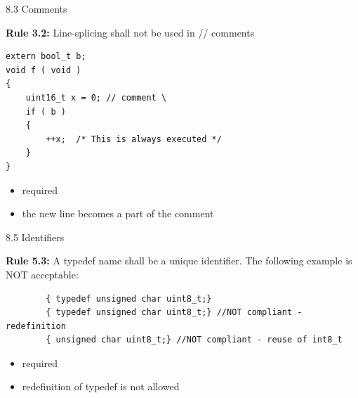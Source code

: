 \documentclass[t]{beamer} %
\begin{document}

\begin{frame}[fragile]{8.3 Comments}
\begin{block}{\textbf{Rule 3.2:} Line-splicing shall not be used in // comments}


\begin{lstlisting}
extern bool_t b;
void f ( void )
{
    uint16_t x = 0; // comment \
    if ( b )
    {
        ++x;  /* This is always executed */
    }
}
\end{lstlisting}
\begin{itemize}
    \item required
    \item the new line becomes a part of the comment
\end{itemize}{}

\end{block}{}
\end{frame}
\begin{frame}[fragile]{8.5 Identifiers}
\begin{block}{\textbf{Rule 5.3:} A typedef name shall be a unique identifier.}
The following example is NOT acceptable:
    \begin{lstlisting}
        { typedef unsigned char uint8_t;}
        { typedef unsigned char uint8_t;} //NOT compliant - redefinition
        { unsigned char uint8_t;} //NOT compliant - reuse of int8_t
    \end{lstlisting}
    \begin{itemize}
        \item required
        \item redefinition of typedef is not allowed
    \end{itemize}
\end{block}{}

\end{frame}


\end{document}

